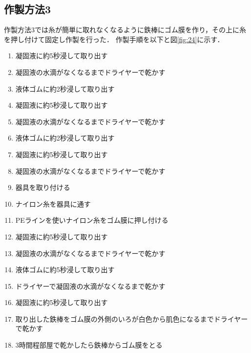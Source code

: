 \subsection{作製方法3}
作製方法3では糸が簡単に取れなくなるように鉄棒にゴム膜を作り，その上に糸を押し付けて固定し作製を行った．
作製手順を以下と図\ref{fig:24}に示す．
\begin{enumerate}
  \item 凝固液に約5秒浸して取り出す
  \item 凝固液の水滴がなくなるまでドライヤーで乾かす
  \item 液体ゴムに約2秒浸して取り出す
  \item 凝固液に約5秒浸して取り出す
  \item 凝固液の水滴がなくなるまでドライヤーで乾かす
  \item 液体ゴムに約2秒浸して取り出す
  \item 凝固液に約5秒浸して取り出す
  \item 凝固液の水滴がなくなるまでドライヤーで乾かす
  \item 器具を取り付ける
  \item ナイロン糸を器具に通す
  \item PEラインを使いナイロン糸をゴム膜に押し付ける
  \item 凝固液に約5秒浸して取り出す
  \item 凝固液の水滴がなくなるまでドライヤーで乾かす
  \item 液体ゴムに約5秒浸して取り出す
  \item ドライヤーで凝固液の水滴がなくなるまで乾かす
  \item 凝固液に約5秒浸して取り出す
  \item 取り出した鉄棒をゴム膜の外側のいろが白色から肌色になるまでドライヤーで乾かす
  \item 3時間程部屋で乾かしたら鉄棒からゴム膜をとる
\end{enumerate}

